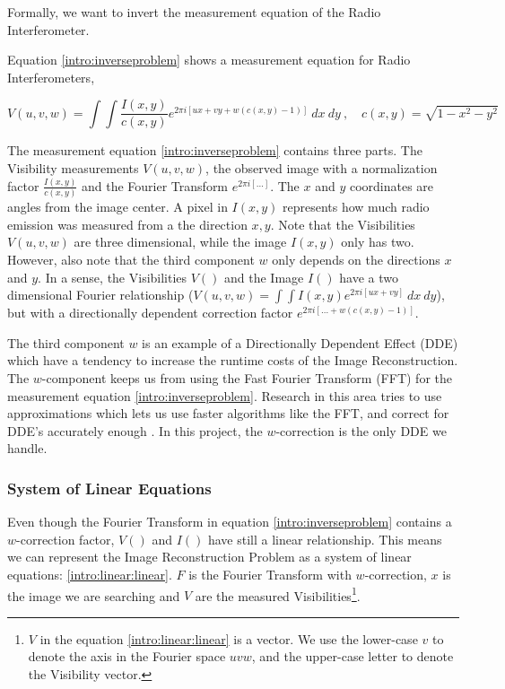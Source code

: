 Formally, we want to invert the measurement equation of the Radio Interferometer.

Equation \eqref{intro:inverseproblem} shows a measurement equation for Radio Interferometers, 


\begin{equation}\label{intro:inverseproblem}
V(u, v, w) = \int\int  \frac{I(x, y)}{c(x, y)}  e^{2 \pi i [ux+vy+ w(c(x, y) - 1)]} \: dx \: dy \:,  \quad c(x,y) = \sqrt{1 - x^2 - y ^2}
\end{equation}

The measurement equation \eqref{intro:inverseproblem} contains three parts. The Visibility measurements $V(u,v,w)$, the observed image with a normalization factor $\frac{I(x, y)}{c(x, y)}$ and the Fourier Transform $e^{2 \pi i [\ldots]}$. The $x$ and $y$ coordinates are angles from the image center. A pixel in $I(x,y)$ represents how much radio emission was measured from a the direction $x,y$. Note that the Visibilities $V(u,v,w)$ are three dimensional, while the image $I(x,y)$ only has two. However, also note that the third component $w$ only depends on the directions $x$ and $y$. In a sense, the Visibilities $V()$ and the Image $I()$ have a two dimensional Fourier relationship ($V(u,v,w) = \int\int I(x,y) e^{2 \pi i [ux+vy]} \: dx \: dy$), but with a directionally dependent correction factor $e^{2 \pi i [\ldots +w(c(x, y) - 1)]}$. 

The third component $w$ is an example of a Directionally Dependent Effect (DDE) which have a tendency to increase the runtime costs of the Image Reconstruction. The $w$-component keeps us from using the Fast Fourier Transform (FFT) for the measurement equation \eqref{intro:inverseproblem}. Research in this area tries to use approximations which lets us use faster algorithms like the FFT, and correct for DDE's accurately enough \cite{veenboer2017image, offringa2014wsclean, pratley2018fast}. In this project, the $w$-correction is the only DDE we handle.

\subsubsection{System of Linear Equations}\label{intro:linear}
Even though the Fourier Transform in equation \eqref{intro:inverseproblem} contains a $w$-correction factor, $V()$ and $I()$ have still a linear relationship. This means we can represent the Image Reconstruction Problem as a system of linear equations: \eqref{intro:linear:linear}. $F$ is the Fourier Transform with $w$-correction, $x$ is the image we are searching and $V$ are the measured Visibilities\footnote{$V$ in the equation \eqref{intro:linear:linear} is a vector. We use the lower-case $v$ to denote the axis in the Fourier space $uvw$, and the upper-case letter to denote the Visibility vector.}.

